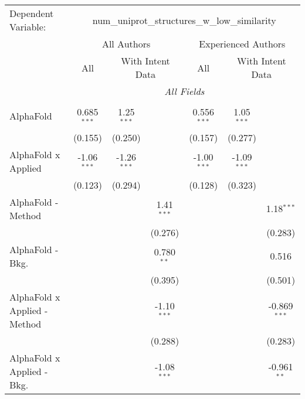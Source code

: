 \begingroup
\centering
\begin{tabular}{lcccccc}
   \tabularnewline \midrule \midrule
   Dependent Variable: & \multicolumn{6}{c}{num\_uniprot\_structures\_w\_low\_similarity}\\
 & \multicolumn{3}{c}{All Authors} & \multicolumn{3}{c}{Experienced Authors} \\
\cmidrule(lr){2-4} \cmidrule(lr){5-7}
 & \multicolumn{1}{c}{All} & \multicolumn{2}{c}{With Intent Data} & \multicolumn{1}{c}{All} & \multicolumn{2}{c}{With Intent Data} \\
\cmidrule(lr){2-2} \cmidrule(lr){3-4} \cmidrule(lr){5-5} \cmidrule(lr){6-7}
 & \multicolumn{6}{c}{\textit{All Fields}} \\ \\
   AlphaFold                      & 0.685$^{***}$  & 1.25$^{***}$  &               & 0.556$^{***}$ & 1.05$^{***}$  &   \\   
                                  & (0.155)        & (0.250)       &               & (0.157)       & (0.277)       &   \\   
   AlphaFold x Applied            & -1.06$^{***}$  & -1.26$^{***}$ &               & -1.00$^{***}$ & -1.09$^{***}$ &   \\   
                                  & (0.123)        & (0.294)       &               & (0.128)       & (0.323)       &   \\   
   AlphaFold - Method             &                &               & 1.41$^{***}$  &               &               & 1.18$^{***}$\\   
                                  &                &               & (0.276)       &               &               & (0.283)\\   
   AlphaFold - Bkg.               &                &               & 0.780$^{**}$  &               &               & 0.516\\   
                                  &                &               & (0.395)       &               &               & (0.501)\\   
   AlphaFold x Applied - Method   &                &               & -1.10$^{***}$ &               &               & -0.869$^{***}$\\   
                                  &                &               & (0.288)       &               &               & (0.283)\\   
   AlphaFold x Applied - Bkg.     &                &               & -1.08$^{***}$ &               &               & -0.961$^{**}$\\   

\end{tabular}
